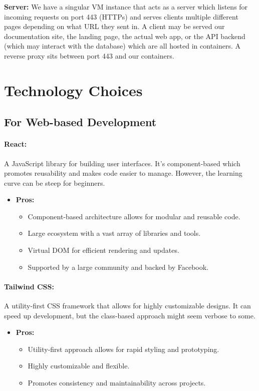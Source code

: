 \documentclass[11pt,a4paper]{article}
\begin{document}
\textbf{Server:} We have a singular VM instance that acts as a server which listens for incoming requests on port 443 (HTTPs) and serves clients multiple different pages depending on what URL they sent in. A client may be served our documentation site, the landing page, the actual web app, or the API backend (which may interact with the database) which are all hosted in containers. A reverse proxy sits between port 443 and our containers.

\pagebreak

\section*{Technology Choices}
\subsection*{For Web-based Development}
\paragraph{React:} A JavaScript library for building user interfaces. It's component-based which promotes reusability and makes code easier to manage. However, the learning curve can be steep for beginners.
\begin{itemize}
    \item \textbf{Pros:}
          \begin{itemize}
              \item Component-based architecture allows for modular and reusable code.
              \item Large ecosystem with a vast array of libraries and tools.
              \item Virtual DOM for efficient rendering and updates.
              \item Supported by a large community and backed by Facebook.
          \end{itemize}
\end{itemize}

\paragraph{Tailwind CSS:} A utility-first CSS framework that allows for highly customizable designs. It can speed up development, but the class-based approach might seem verbose to some.
\begin{itemize}
    \item \textbf{Pros:}
          \begin{itemize}
              \item Utility-first approach allows for rapid styling and prototyping.
              \item Highly customizable and flexible.
              \item Promotes consistency and maintainability across projects.
          \end{itemize}
\end{itemize}
\end{document}
